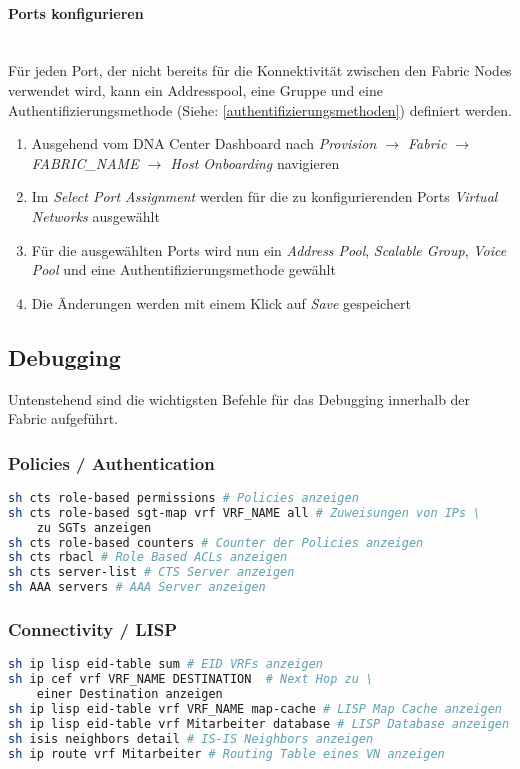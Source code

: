 \paragraph{Ports konfigurieren}
~\\
Für jeden Port, der nicht bereits für die Konnektivität zwischen den Fabric Nodes verwendet wird, kann ein Addresspool, eine Gruppe und eine Authentifizierungsmethode (Siehe: \ref{authentifizierungsmethoden}) definiert werden. 
\begin{enumerate}
	\item Ausgehend vom DNA Center Dashboard nach \textit{Provision $\rightarrow$ Fabric $\rightarrow$ FABRIC\_NAME $\rightarrow$ Host Onboarding} navigieren 
	\item Im \textit{Select Port Assignment} werden für die zu konfigurierenden Ports \textit{Virtual Networks} ausgewählt
	\item Für die ausgewählten Ports wird nun ein \textit{Address Pool}, \textit{Scalable Group}, \textit{Voice Pool} und eine Authentifizierungsmethode gewählt
	\item Die Änderungen werden mit einem Klick auf \textit{Save} gespeichert 
\end{enumerate}

\subsection{Debugging}
Untenstehend sind die wichtigsten Befehle für das Debugging innerhalb der Fabric aufgeführt.

\subsubsection{Policies / Authentication}

\begin{lstlisting}[language=bash]
sh cts role-based permissions # Policies anzeigen
sh cts role-based sgt-map vrf VRF_NAME all # Zuweisungen von IPs \
    zu SGTs anzeigen
sh cts role-based counters # Counter der Policies anzeigen
sh cts rbacl # Role Based ACLs anzeigen
sh cts server-list # CTS Server anzeigen
sh AAA servers # AAA Server anzeigen
\end{lstlisting}

\subsubsection{Connectivity / LISP}

\begin{lstlisting}[language=bash]
sh ip lisp eid-table sum # EID VRFs anzeigen
sh ip cef vrf VRF_NAME DESTINATION  # Next Hop zu \
    einer Destination anzeigen
sh ip lisp eid-table vrf VRF_NAME map-cache # LISP Map Cache anzeigen
sh ip lisp eid-table vrf Mitarbeiter database # LISP Database anzeigen
sh isis neighbors detail # IS-IS Neighbors anzeigen
sh ip route vrf Mitarbeiter # Routing Table eines VN anzeigen
\end{lstlisting}
